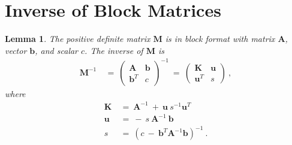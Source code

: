 \documentclass{article}
\newtheorem{lemma}{Lemma}
\newcommand\Bb{\bm{b}}
\newcommand\Bu{\bm{u}}
\newcommand\BA{\bm{A}}
\newcommand\BK{\bm{K}}
\newcommand\BM{\bm{M}}
\begin{document}
\small{
\setlength{\bibsep}{1.5pt}


}

\appendix

\section{Inverse of Block Matrices}
\label{sec:inverse}

\begin{lemma}
\label{th:lemma1}
The positive definite matrix $\BM$ is in block format with
matrix $\BA$, vector $\Bb$, and scalar $c$.
The inverse of $\BM$ is
\begin{align}
\BM^{-1} \ &= \
\begin{pmatrix}
\BA & \Bb \\
\Bb^T & c
\end{pmatrix}^{-1} \ = \
\begin{pmatrix}
\BK & \Bu \\
\Bu^T & s
\end{pmatrix} \ ,
\end{align}
where
\begin{align}
\BK \ &= \ \BA^{-1}  \ + \  \Bu \ s^{-1} \Bu^T \\
\Bu \ &= \ - \  s \ \BA^{-1} \ \Bb \\
s \ &= \ \left( c \ - \ \Bb^T\BA^{-1} \Bb \right)^{-1} \ .
\end{align}
\end{lemma}
\end{document}
